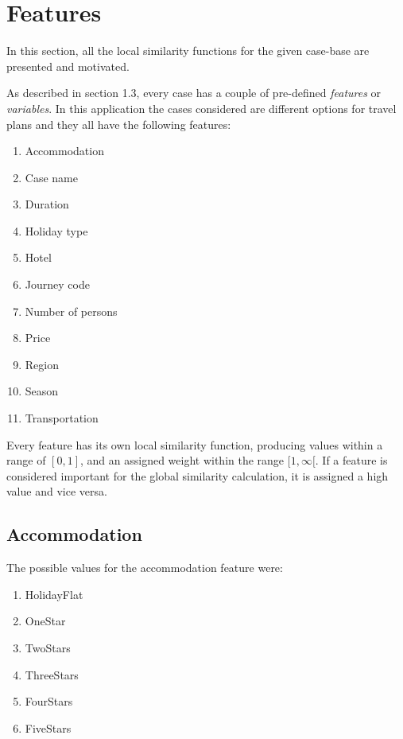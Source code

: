 \documentclass[12pt]{article}
\begin{document}
\clearpage

\section{Features}
\label{sec:features}

In this section, all the local similarity functions for the given case-base are presented and motivated. 

As described in section 1.3, every case has a couple of pre-defined \textit{features} or \textit{variables}. In this application the cases considered are different options for travel plans and they all have the following features:

\begin{enumerate}
\item Accommodation
\item Case name
\item Duration
\item Holiday type
\item Hotel
\item Journey code
\item Number of persons
\item Price
\item Region
\item Season
\item Transportation
\end{enumerate}

Every feature has its own local similarity function, producing values within a range of $[0,1]$, and an assigned weight within the range $[1,\infty[$. If a feature is considered important for the global similarity calculation, it is assigned a high value and vice versa. 

\subsection{Accommodation}
\label{sec:accommodation}

The possible values for the accommodation feature were: 

\begin{enumerate}
\item HolidayFlat
\item OneStar
\item TwoStars
\item ThreeStars
\item FourStars
\item FiveStars
\end{enumerate}
\end{document}

